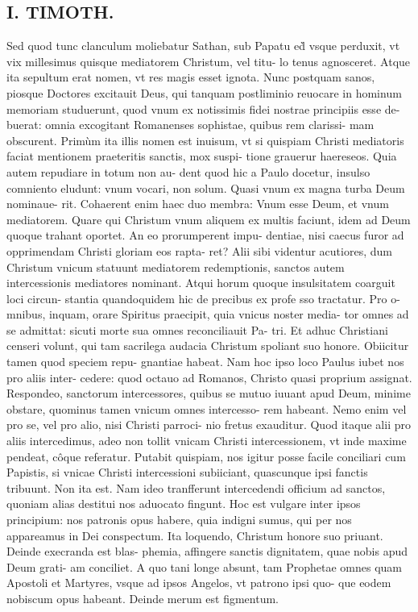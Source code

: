 \documentclass{article}
\begin{document}
\begin{pages}
\section*{I. TIMOTH. }
\marginpar{[ p.22 ]}\pstart Sed quod tunc clanculum moliebatur Sathan, sub Papatu ed̀ vsque perduxit, vt vix millesimus quisque mediatorem Christum, vel titu- lo tenus agnosceret. Atque ita sepultum erat nomen, vt res magis esset ignota. Nunc postquam sanos, piosque Doctores excitauit Deus, qui tanquam postliminio reuocare in hominum memoriam studuerunt, quod vnum ex notissimis fidei nostrae principiis esse de- buerat: omnia excogitant Romanenses sophistae, quibus rem clarissi- mam obscurent. Primùm ita illis nomen est inuisum, vt si quispiam Christi mediatoris faciat mentionem praeteritis sanctis, mox suspi- tione grauerur haereseos. Quia autem repudiare in totum non au- dent quod hic a Paulo docetur, insulso comniento eludunt: vnum vocari, non solum. Quasi vnum ex magna turba Deum nominaue- rit. Cohaerent enim haec duo membra: Vnum esse Deum, et vnum mediatorem. Quare qui Christum vnum aliquem ex multis faciunt, idem ad Deum quoque trahant oportet. An eo prorumperent impu- dentiae, nisi caecus furor ad opprimendam Christi gloriam eos rapta- ret? Alii sibi videntur acutiores, dum Christum vnicum statuunt mediatorem redemptionis, sanctos autem intercessionis mediatores nominant. Atqui horum quoque insulsitatem coarguit loci circun- stantia quandoquidem hic de precibus ex profe sso tractatur. Pro o- mnibus, inquam, orare Spiritus praecipit, quia vnicus noster media- tor omnes ad se admittat: sicuti morte sua omnes reconciliauit Pa- tri. Et adhuc Christiani censeri volunt, qui tam sacrilega audacia Christum spoliant suo honore. Obiicitur tamen quod speciem repu- gnantiae habeat. Nam hoc ipso loco Paulus iubet nos pro aliis inter- cedere: quod octauo ad Romanos, Christo quasi proprium assignat. Respondeo, sanctorum intercessores, quibus se mutuo iuuant apud Deum, minime obstare, quominus tamen vnicum omnes intercesso- rem habeant. Nemo enim vel pro se, vel pro alio, nisi Christi parroci- nio fretus exauditur. Quod itaque alii pro aliis intercedimus, adeo non tollit vnicam Christi intercessionem, vt inde maxime pendeat, côque referatur. Putabit quispiam, nos igitur posse facile conciliari cum Papistis, si vnicae Christi intercessioni subiiciant, quascunque ipsi fanctis tribuunt. Non ita est. Nam ideo tranfferunt intercedendi officium ad sanctos, quoniam alias destitui nos aduocato fingunt. Hoc est vulgare inter ipsos principium: nos patronis opus habere, quia indigni sumus, qui per nos appareamus in Dei conspectum. Ita loquendo, Christum honore suo priuant. Deinde execranda est blas- phemia, affingere sanctis dignitatem, quae nobis apud Deum grati- am conciliet. A quo tani longe absunt, tam Prophetae omnes quam Apostoli et Martyres, vsque ad ipsos Angelos, vt patrono ipsi quo- que eodem nobiscum opus habeant. Deinde merum est figmentum.  \pend

\end{pages}
\end{document}
